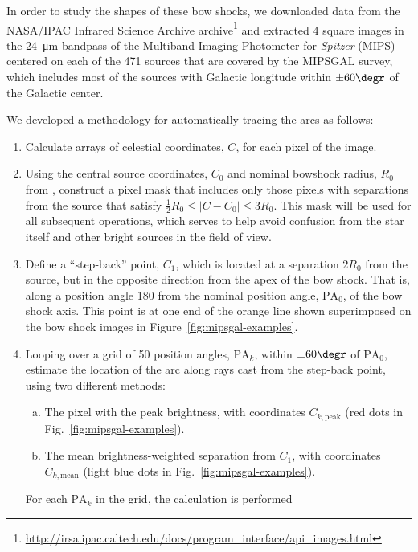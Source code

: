 In order to study the shapes of these bow shocks, we downloaded data
from the NASA/IPAC Infrared Science Archive archive\footnote{
  \url{http://irsa.ipac.caltech.edu/docs/program_interface/api_images.html}}
and extracted 4\arcmin{} square images in the \SI{24}{\um} bandpass of
the Multiband Imaging Photometer for \textit{Spitzer} (MIPS) centered
on each of the 471 \citet{Kobulnicky:2016a} sources that are covered
by the MIPSGAL \citep{Carey:2009a} survey, which includes most of the
sources with Galactic longitude within \(\pm 60\degr\) of the Galactic
center.

We developed a methodology for automatically tracing the arcs as follows:
\begin{enumerate}[1.]
\item Calculate arrays of celestial coordinates, \(C\), for each pixel
  of the image.
\item Using the central source coordinates, \(C_0\) and nominal
  bowshock radius, \(R_0\) from \citet{Kobulnicky:2016a}, construct a
  pixel mask that includes only those pixels with separations from the
  source that satisfy \(\frac12 R_0 \le |C - C_0| \le 3 R_0\).  This mask
  will be used for all subsequent operations, which serves to help
  avoid confusion from the star itself and other bright sources in the
  field of view.
\item Define a ``step-back'' point, \(C_1\), which is located at a
  separation \(2 R_0\) from the source, but in the opposite direction
  from the apex of the bow shock. That is, along a position angle
  180\degr{} from the nominal position angle, \(\text{PA}_0\), of the
  bow shock axis.  This point is at one end of the orange line shown
  superimposed on the bow shock images in
  Figure~\ref{fig:mipsgal-examples}.
\item Looping over a grid of 50 position angles, \(\text{PA}_k\),
  within \(\pm 60\degr\) of \(\text{PA}_0\), estimate the location of
  the arc along rays cast from the step-back point, using two
  different methods:
  \begin{enumerate}[(a)]
  \item The pixel with the peak brightness, with coordinates
    \(C_{k,\text{peak}}\) (red dots in
    Fig.~\ref{fig:mipsgal-examples}).
  \item The mean brightness-weighted separation from \(C_1\), with
    coordinates \(C_{k,\text{mean}}\) (light blue dots in
    Fig.~\ref{fig:mipsgal-examples}).
  \end{enumerate}
  For each \(\text{PA}_k\) in the grid, the calculation is performed

\end{enumerate}
